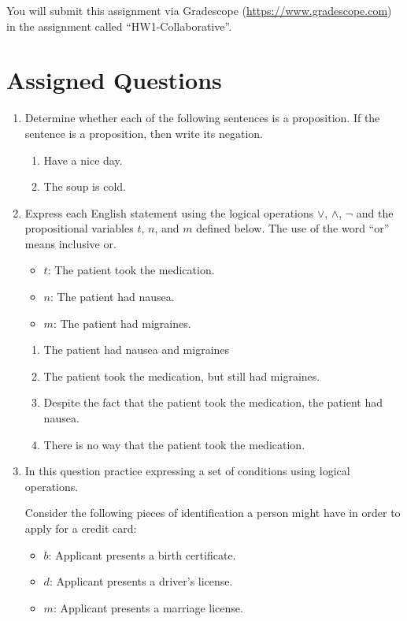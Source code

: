 \documentclass[12pt, oneside]{article}
\begin{document}
You will submit this assignment via Gradescope
(\href{https://www.gradescope.com}{https://www.gradescope.com}) in the assignment called ``HW1-Collaborative''.

\section*{Assigned Questions}
\begin{enumerate}
\item Determine whether each of the following sentences is a proposition. If the sentence is a proposition, then write its negation.
\begin{enumerate}
    \item Have a nice day.
    \item The soup is cold.
\end{enumerate}
\item Express each English statement using the logical operations $\lor$, $\land$, $\neg$ and the propositional variables $t$, $n$, and $m$ defined below. The use of the word ``or'' means inclusive or.
\begin{itemize}
    \item $t$: The patient took the medication.
    \item $n$: The patient had nausea.
    \item $m$: The patient had migraines.
\end{itemize}

\begin{enumerate}
    \item The patient had nausea and migraines
    \item The patient took the medication, but still had migraines.
    \item Despite the fact that the patient took the medication, the patient had nausea.
    \item There is no way that the patient took the medication.
\end{enumerate}


\item In this question practice expressing a set of conditions using logical operations.

Consider the following pieces of identification a person might have in order to apply for a credit card:
\begin{itemize}
    \item $b$: Applicant presents a birth certificate.
    \item $d$: Applicant presents a driver's license.
    \item $m$: Applicant presents a marriage license.
\end{itemize}


\end{enumerate}
\end{document}
